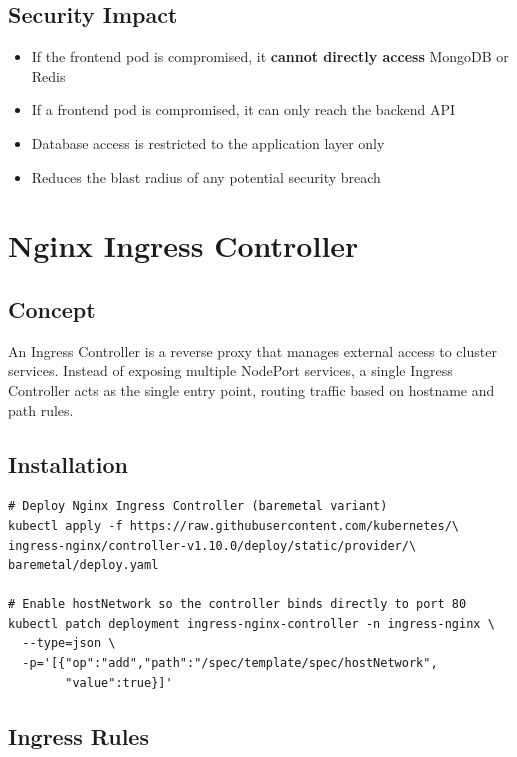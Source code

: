 \documentclass[12pt,a4paper]{report}
\begin{document}
\subsection{Security Impact}

\begin{itemize}
  \item If the frontend pod is compromised, it \textbf{cannot directly access} MongoDB or Redis
  \item If a frontend pod is compromised, it can only reach the backend API
  \item Database access is restricted to the application layer only
  \item Reduces the blast radius of any potential security breach
\end{itemize}

\section{Nginx Ingress Controller}

\subsection{Concept}

An Ingress Controller is a reverse proxy that manages external access to cluster services. Instead of exposing multiple NodePort services, a single Ingress Controller acts as the single entry point, routing traffic based on hostname and path rules.

\subsection{Installation}

\begin{lstlisting}[style=bashstyle, caption={Nginx Ingress Controller Installation}]
# Deploy Nginx Ingress Controller (baremetal variant)
kubectl apply -f https://raw.githubusercontent.com/kubernetes/\
ingress-nginx/controller-v1.10.0/deploy/static/provider/\
baremetal/deploy.yaml

# Enable hostNetwork so the controller binds directly to port 80
kubectl patch deployment ingress-nginx-controller -n ingress-nginx \
  --type=json \
  -p='[{"op":"add","path":"/spec/template/spec/hostNetwork",
        "value":true}]'
\end{lstlisting}

\subsection{Ingress Rules}
\end{document}
